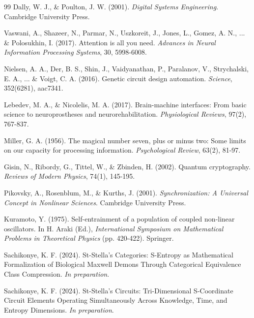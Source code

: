 \documentclass[11pt,a4paper]{article}
\begin{document}
\begin{thebibliography}{99}
Dally, W. J., & Poulton, J. W. (2001). \textit{Digital Systems Engineering}. Cambridge University Press.

Vaswani, A., Shazeer, N., Parmar, N., Uszkoreit, J., Jones, L., Gomez, A. N., ... \& Polosukhin, I. (2017). Attention is all you need. \textit{Advances in Neural Information Processing Systems}, 30, 5998-6008.

Nielsen, A. A., Der, B. S., Shin, J., Vaidyanathan, P., Paralanov, V., Strychalski, E. A., ... \& Voigt, C. A. (2016). Genetic circuit design automation. \textit{Science}, 352(6281), aac7341.

Lebedev, M. A., & Nicolelis, M. A. (2017). Brain-machine interfaces: From basic science to neuroprostheses and neurorehabilitation. \textit{Physiological Reviews}, 97(2), 767-837.

Miller, G. A. (1956). The magical number seven, plus or minus two: Some limits on our capacity for processing information. \textit{Psychological Review}, 63(2), 81-97.

Gisin, N., Ribordy, G., Tittel, W., \& Zbinden, H. (2002). Quantum cryptography. \textit{Reviews of Modern Physics}, 74(1), 145-195.

Pikovsky, A., Rosenblum, M., \& Kurths, J. (2001). \textit{Synchronization: A Universal Concept in Nonlinear Sciences}. Cambridge University Press.

Kuramoto, Y. (1975). Self-entrainment of a population of coupled non-linear oscillators. In H. Araki (Ed.), \textit{International Symposium on Mathematical Problems in Theoretical Physics} (pp. 420-422). Springer.

Sachikonye, K. F. (2024). St-Stella's Categories: S-Entropy as Mathematical Formalization of Biological Maxwell Demons Through Categorical Equivalence Class Compression. \textit{In preparation}.

Sachikonye, K. F. (2024). St-Stella's Circuits: Tri-Dimensional S-Coordinate Circuit Elements Operating Simultaneously Across Knowledge, Time, and Entropy Dimensions. \textit{In preparation}.


\end{thebibliography}
\end{document}
